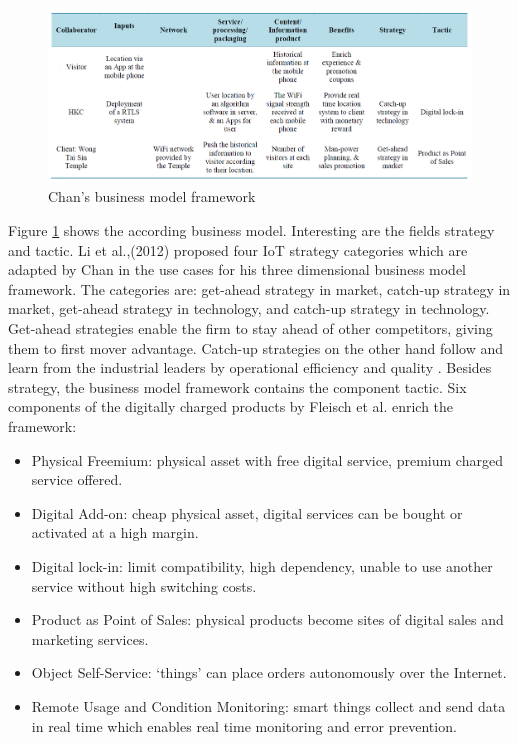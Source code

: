 			\begin{figure}[ht]
			    \begin{center}
			    \includegraphics[scale=0.5]{Talk11/chanexample.png}
			    \end{center}
			    \caption{Chan's business model framework}
			    \label{Chan exmaple}
			\end{figure}

	Figure \ref{Chan exmaple} shows the according business model. Interesting are the fields strategy and tactic. Li et al.,(2012) \cite{li} proposed four IoT strategy categories which are adapted by Chan in the use cases for his three dimensional business model framework. The categories are: get-ahead strategy in market, catch-up strategy in market, get-ahead strategy in technology, and catch-up strategy in technology. Get-ahead strategies enable the firm to stay ahead of other competitors, giving them to first mover advantage. Catch-up strategies on the other hand follow and learn from the industrial leaders by operational efficiency and quality \cite{chan}.
	Besides strategy, the business model framework contains the component tactic. Six components of the digitally charged products by Fleisch et al.\cite{fleisch} enrich the framework:

\begin{itemize}
	\item Physical Freemium: physical asset with free digital service, premium charged service offered.
	\item Digital Add-on: cheap physical asset, digital services can be bought or activated at a high margin.
	\item Digital lock-in: limit compatibility, high dependency, unable to use another service without high switching costs.
	\item Product as Point of Sales: physical products become  sites of digital sales and marketing services.
	\item Object Self-Service: `things' can place orders autonomously over the Internet. 
	\item Remote Usage and Condition Monitoring: smart things collect and send data in real time which enables real time monitoring and error prevention.
\end{itemize}


